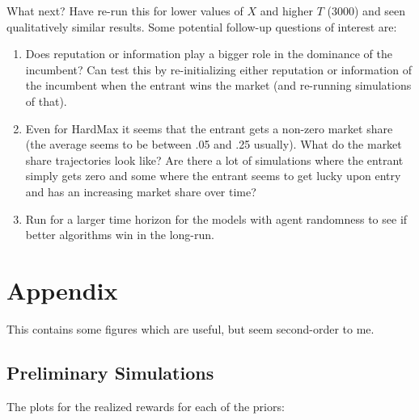 \documentclass[11pt,letterpaper]{article}
\begin{document}


What next? Have re-run this for lower values of $X$ and higher $T$ (3000) and seen qualitatively similar results. Some potential follow-up questions of interest are:
\begin{enumerate}
\item Does reputation or information play a bigger role in the dominance of the incumbent? Can test this by re-initializing either reputation or information of the incumbent when the entrant wins the market (and re-running simulations of that).
\item Even for HardMax it seems that the entrant gets a non-zero market share (the average seems to be between .05 and .25 usually). What do the market share trajectories look like? Are there a lot of simulations where the entrant simply gets zero and some where the entrant seems to get lucky upon entry and has an increasing market share over time?
\item Run for a larger time horizon for the models with agent randomness to see if better algorithms win in the long-run.
\end{enumerate}

\section*{Appendix}

This contains some figures which are useful, but seem second-order to me.

\subsection*{Preliminary Simulations}

The plots for the realized rewards for each of the priors:
\end{document}
